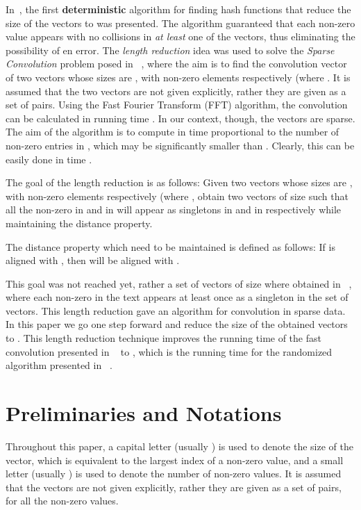 \documentclass[11pt,amssymb]{article}
\begin{document}
In~\cite{LR07}, the first {\bf deterministic} algorithm for
finding  hash functions that reduce the size of the vectors to
 was presented. The algorithm guaranteed that each
non-zero value appears with no collisions in {\em at least} one of the
vectors, thus eliminating the possibility of en error.
The {\em length reduction} idea was used to solve the {\it Sparse
Convolution} problem posed in ~\cite{muthu-open}, where the aim is to
find the convolution vector  of two vectors  whose sizes
are , with  non-zero elements respectively (where
. It is assumed that the two vectors are not given
explicitly, rather they are given as a set of 
pairs. Using the Fast Fourier Transform (FFT) algorithm, the
convolution can be calculated in running time \cite{CLR-92}. In our context, though, the vectors  are
sparse. The aim of the algorithm is to compute  in time
proportional to the number of non-zero entries in , which may be
significantly smaller than . Clearly, this can be easily done
in time .

The goal of the length reduction is as follows: Given two vectors
 whose sizes are , with  non-zero
elements respectively (where , obtain two vectors
 of size  such that all the non-zero in  and
in  will appear as singletons in  and in 
respectively while maintaining the distance property.

The distance property which need to be maintained is defined as
follows: If  is aligned with , then
 will be aligned with .

This goal was not reached yet, rather a set of  vectors
of size  where obtained in ~\cite{LR07}, where each
non-zero in the text appears at least once as a singleton in the set
of vectors. This length reduction gave an 
algorithm for convolution in sparse data. In this paper we go one
step forward and reduce the size of the obtained vectors to
. This length reduction technique improves the running time
of the fast convolution presented in ~\cite{LR07} to , which is the running time for the randomized algorithm
presented in ~\cite{CH:02}.


\section{Preliminaries and Notations}\label{s:pre}

Throughout this paper, a capital letter (usually ) is used to
denote the size of the vector, which is equivalent to the largest
index of a non-zero value, and a small letter (usually ) is used
to denote the number of non-zero values. It is assumed that the
vectors are not given explicitly, rather they are given as a set of
 pairs, for all the non-zero values.
\end{document}
